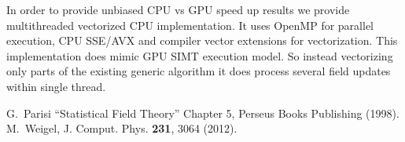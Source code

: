 \documentclass[a4paper]{llncs}
\begin{document}
In order to provide unbiased CPU vs GPU speed up results we provide
multithreaded vectorized CPU implementation. It uses OpenMP for parallel
execution, CPU SSE/AVX and compiler vector extensions for vectorization.
This implementation  does mimic GPU SIMT execution model.
So instead vectorizing only parts of the existing generic algorithm it does
process several field updates within single thread.



\begin{thebibliography}{9}
 G.~Parisi ``Statistical Field Theory'' Chapter 5, Perseus Books Publishing (1998).
 M.~Weigel, J. Comput. Phys. \textbf{231}, 3064 (2012).
\end{thebibliography}
\end{document}
